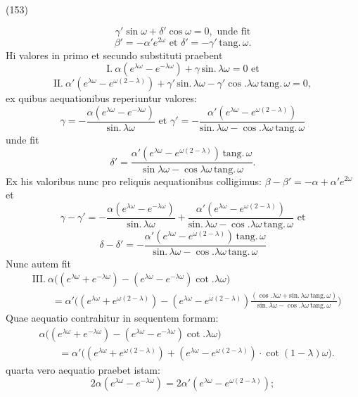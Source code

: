 \documentclass[11pt,a4paper]{article}
\begin{document}
(153)

\[ \gamma'\sin\omega+\delta'\cos\omega=0, \text{ unde fit} \]
\[ \beta'=-\alpha' e^{2\omega} \text{ et } \delta'=-\gamma'\,\text{tang.}\,\omega. \]
Hi valores in primo et secundo substituti praebent
\[ \text{I.}\ \alpha(e^{\lambda\omega}-e^{-\lambda\omega})+\gamma\,\text{sin.}\,\lambda\omega=0 \text{ et} \]
\[ \text{II.}\ \alpha'(e^{\lambda\omega}-e^{\omega(2-\lambda)})+\gamma'\,\text{sin.}\,\lambda\omega-\gamma'\cos.\lambda\omega\,\text{tang.}\,\omega=0, \]
ex quibus aequationibus reperiuntur valores:
\[ \gamma=-\frac{\alpha(e^{\lambda\omega}-e^{-\lambda\omega})}{\text{sin.}\,\lambda\omega} \text{ et } \gamma'=-\frac{\alpha'(e^{\lambda\omega}-e^{\omega(2-\lambda)})}{\text{sin.}\,\lambda\omega-\cos.\lambda\omega\,\text{tang.}\,\omega} \]
unde fit
\[ \delta'=\frac{\alpha'(e^{\lambda\omega}-e^{\omega(2-\lambda)})\,\text{tang.}\,\omega}{\sin\lambda\omega-\cos\lambda\omega\,\text{tang.}\,\omega}. \]
Ex his valoribus nunc pro reliquis aequationibus colligimus: $\beta-\beta'=-\alpha+\alpha' e^{2\omega}$
et
\[ \gamma-\gamma'=-\frac{\alpha(e^{\lambda\omega}-e^{-\lambda\omega})}{\text{sin.}\,\lambda\omega}+\frac{\alpha'(e^{\lambda\omega}-e^{\omega(2-\lambda)})}{\text{sin.}\,\lambda\omega-\cos.\lambda\omega\,\text{tang.}\,\omega} \text{ et} \]
\[ \delta-\delta'=-\frac{\alpha'(e^{\lambda\omega}-e^{\omega(2-\lambda)})\,\text{tang.}\,\omega}{\text{sin.}\,\lambda\omega-\cos.\lambda\omega\,\text{tang.}\,\omega} \]
Nunc autem fit
\begin{align*}
&\text{III.}\ \alpha\big((e^{\lambda\omega}+e^{-\lambda\omega})-(e^{\lambda\omega}-e^{-\lambda\omega})\cot.\lambda\omega\big) \\
&\qquad=\alpha'\Big((e^{\lambda\omega}+e^{\omega(2-\lambda)})-(e^{\lambda\omega}-e^{\omega(2-\lambda)})\frac{(\cos.\lambda\omega+\text{sin.}\,\lambda\omega\,\text{tang.}\,\omega)}{\text{sin.}\,\lambda\omega-\cos.\lambda\omega\,\text{tang.}\,\omega}\Big)
\end{align*}
Quae aequatio contrahitur in sequentem formam:
\begin{align*}
&\alpha\big((e^{\lambda\omega}+e^{-\lambda\omega})-(e^{\lambda\omega}-e^{-\lambda\omega})\cot.\lambda\omega\big) \\
&\qquad=\alpha'\big((e^{\lambda\omega}+e^{\omega(2-\lambda)})+(e^{\lambda\omega}-e^{\omega(2-\lambda)})\cdot\cot(1-\lambda)\omega\big).
\end{align*}
quarta vero aequatio praebet istam:
\[ 2\alpha(e^{\lambda\omega}-e^{-\lambda\omega})=2\alpha'(e^{\lambda\omega}-e^{\omega(2-\lambda)}); \]
\end{document}
